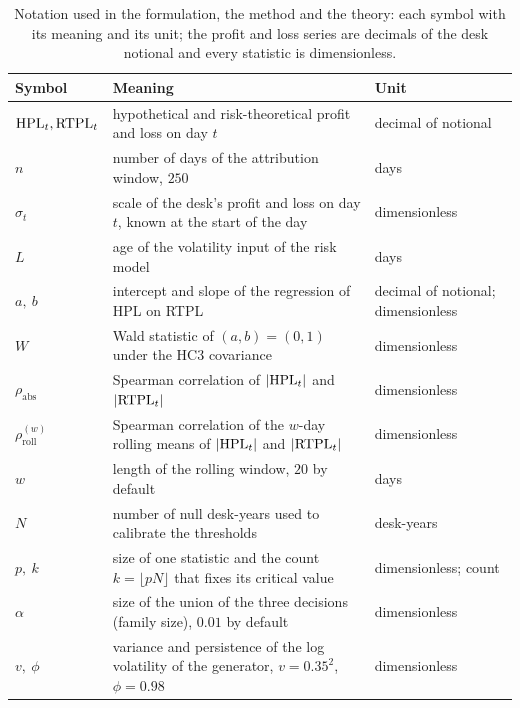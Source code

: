 \begin{table}[htbp]
\centering
\small
\caption{Notation used in the formulation, the method and the theory: each symbol with its meaning and its unit; the profit and loss series are decimals of the desk notional and every statistic is dimensionless.}
\label{tab:notation}
\begin{tabular}{p{2.6cm}p{9.4cm}p{2.2cm}}
\toprule
Symbol & Meaning & Unit \\
\midrule
$\mathrm{HPL}_t,\mathrm{RTPL}_t$ & hypothetical and risk-theoretical profit and loss on day $t$ & decimal of notional \\
$n$ & number of days of the attribution window, $250$ & days \\
$\sigma_t$ & scale of the desk's profit and loss on day $t$, known at the start of the day & dimensionless \\
$L$ & age of the volatility input of the risk model & days \\
$a,\ b$ & intercept and slope of the regression of HPL on RTPL & decimal of notional; dimensionless \\
$W$ & Wald statistic of $(a,b)=(0,1)$ under the HC3 covariance & dimensionless \\
$\rho_{\mathrm{abs}}$ & Spearman correlation of $|\mathrm{HPL}_t|$ and $|\mathrm{RTPL}_t|$ & dimensionless \\
$\rho_{\mathrm{roll}}^{(w)}$ & Spearman correlation of the $w$-day rolling means of $|\mathrm{HPL}_t|$ and $|\mathrm{RTPL}_t|$ & dimensionless \\
$w$ & length of the rolling window, $20$ by default & days \\
$N$ & number of null desk-years used to calibrate the thresholds & desk-years \\
$p,\ k$ & size of one statistic and the count $k=\lfloor pN\rfloor$ that fixes its critical value & dimensionless; count \\
$\alpha$ & size of the union of the three decisions (family size), $0.01$ by default & dimensionless \\
$v,\ \phi$ & variance and persistence of the log volatility of the generator, $v=0.35^2$, $\phi=0.98$ & dimensionless \\
\bottomrule
\end{tabular}
\end{table}
